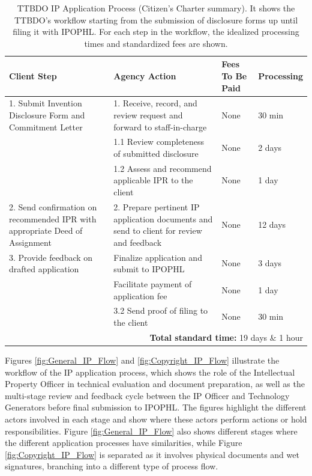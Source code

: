 \begingroup
\setlength{\tabcolsep}{4pt}
\renewcommand{\arraystretch}{1.05}
\small
\begin{table}[H]
\centering
\caption[TTBDO IP Application Process (Citizen's Charter summary)]{
   TTBDO IP Application Process (Citizen's Charter summary). It shows the TTBDO's workflow starting from the submission of disclosure forms up until filing it with IPOPHL. For each step in the workflow, the idealized processing times and standardized fees are shown.
}
\label{tab:ttbdo-process}
\begin{tabular}{|p{4.5cm}|p{4.5cm}|p{2.5cm}|p{2.5cm}|}
\hline
\textbf{Client Step} & \textbf{Agency Action} & \textbf{Fees To Be Paid} & \textbf{Processing} \\
\hline
1. Submit Invention Disclosure Form and Commitment Letter
& 1. Receive, record, and review request and forward to staff-in-charge
& None 
& 30 min \\
\hline
& 1.1 Review completeness of submitted disclosure
& None
& 2 days \\
\hline
& 1.2 Assess and recommend applicable IPR to the client
& None 
& 1 day \\
\hline
2. Send confirmation on recommended IPR with appropriate Deed of Assignment
& 2. Prepare pertinent IP application documents and send to client for review and feedback
& None 
& 12 days \\
\hline
3. Provide feedback on drafted application
& Finalize application and submit to IPOPHL
& None 
& 3 days \\
\hline
& Facilitate payment of application fee
& None 
& 1 day\\
\hline
& 3.2 Send proof of filing to the client
& None 
& 30 min \\
\hline
\multicolumn{4}{|r|}{\textbf{Total standard time:} 19 days \& 1 hour}\vline\\
\hline
\end{tabular}
\end{table}
\endgroup

Figures \ref{fig:General_IP_Flow} and \ref{fig:Copyright_IP_Flow} illustrate the workflow of the IP application process, which shows the role of the Intellectual Property Officer in technical evaluation and document preparation, as well as the multi-stage review and feedback cycle between the IP Officer and Technology Generators before final submission to IPOPHL. The figures highlight the different actors involved in each stage and show where these actors perform actions or hold responsibilities. Figure \ref{fig:General_IP_Flow} also shows different stages where the different application processes have similarities, while Figure \ref{fig:Copyright_IP_Flow} is separated as it involves physical documents and wet signatures, branching into a different type of process flow. 

